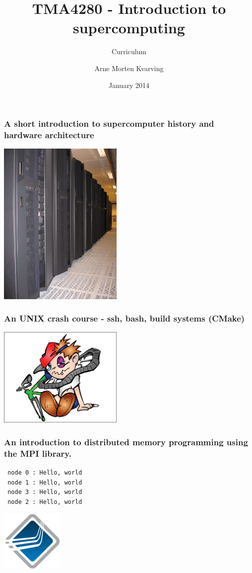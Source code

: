 \documentclass{beamer}
\title{TMA4280 - Introduction to supercomputing}
\subtitle{Curriculum}
\author{Arne Morten Kvarving}
\institute{SINTEF ICT / NTNU}
\date{January 2014}
\begin{document}
\maketitle
\begin{frame}\frametitle{A short introduction to supercomputer history and
                         hardware architecture}
\begin{center}
\includegraphics[width=6cm]{njord_1}
\end{center}
\end{frame}
\begin{frame}\frametitle{An UNIX crash course - ssh, bash, build systems (CMake)}
\begin{center}
\includegraphics[width=6cm]{crash}
\end{center}
\end{frame}
\begin{frame}\frametitle{An introduction to distributed memory programming
                         using the MPI library.}
\begin{center}
\texttt{  node 0 :   Hello, world}\\
\texttt{  node 1 :   Hello, world}\\
\texttt{  node 3 :   Hello, world}\\
\texttt{  node 2 :   Hello, world}
\end{center}
\begin{center}
\includegraphics[width=3cm]{open-mpi-logo}
\end{center}
\end{frame}
\end{document}

